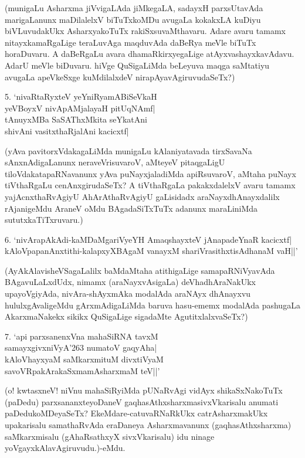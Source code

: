 \begin{itemize}
(munigaLu Asharxma jiVvigaLAda jiMkegaLA, sadayxH parxsUtavAda marigaLanunx maDilalelxV biTuTxkoMDu avugaLa kokakxLA kuDiyu biVLuvudakUkx AsharxyakoTuTx rakiSxsuvaMthavaru. Adare avaru tamamx nitayxkamaRgaLige teraLuvAga maqduvAda daBeRya meVle biTuTx horaDuvaru. A daBeRgaLu avara dhamaRkirxyegaLige atAyxvashayxkavAdavu. AdarU meVle biDuvaru. hiVge QuSigaLiMda beLeyuva maqga saMtatiyu avugaLa apeVkeSxge kuMdilalxdeV nirapAyavAgiruvudaSeTx?)

\begin{shloka}
\item[5.] `nivaRtaRyxteV yeYniRyamABiSeVkaH\\\label{56}
yeVBoyxV nivApAMjalayaH pitUqNAmf|\\
tAnuyxMBa SaSAThxMkita seYkatAni\\
shivAni vasitxthaRjalAni kacicxtf|
\end{shloka}

(yAva pavitorxVdakagaLiMda munigaLu kAlaniyatavada tirxSavaNa sAnxnAdigaLanunx neraveVrisuvaroV, aMteyeV pitaqgaLigU tiloVdakatapaRNavanunx yAva puNayxjaladiMda apiRsuvaroV, aMtaha puNayx tiVthaRgaLu cenAnxgirudaSeTx? A tiVthaRgaLa pakakxdalelxV avaru tamamx yajAcnxthaRvAgiyU AhArAthaRvAgiyU gaLisidadx araNayxdhAnayxdalilx rAjanigeMdu AraneV oMdu BAgadaSiTxTuTx adanunx maraLiniMda sututxkaTiTxruvaru.)

\begin{shloka}
\item[6.] `nivArapAkAdi-kaMDaMgariVyeYH AmaqshayxteV jAnapadeYnaR kacicxtf|\\\label{242}
kAloVpapanAnxtithi-kalapxyXBAgaM vanayxM shariVrasithxtisAdhanaM vaH||'
\end{shloka}

(AyAkAlavisheVSagaLalilx baMdaMtaha atithigaLige samapaRNiVyavAda BAgavuLaLxdUdx, nimamx (araNayxvAsigaLa) deVhadhAraNakUkx upayoVgiyAda, nivAra-shAyxmAka modalAda araNAyx dhAnayxvu hululxgAvaligeMdu gArxmAdigaLiMda baruva hasu-ememx modalAda pashugaLa AkarxmaNakekx sikikx QuSigaLige sigadaMte AgutitxlalxvaSeTx?)

\begin{shloka}
\item[7.] `api parxsanenxVna mahaSiRNA tavxM\\\label{57}
samayxgivxniVyA\char'263 numatoV gaqyAha|\\
kAloVhayxyaM saMkarxmituM divxtiVyaM\\
savoVRpakArakaSxmamAsharxmaM teV||' 
\end{shloka}

(o! kwtasxneV! niVnu mahaSiRyiMda pUNaRvAgi vidAyx shikaSxNakoTuTx (paDedu) parxsananxteyoDaneV gaqhasAthxsharxmasivxVkarisalu anumati paDedukoMDeyaSeTx? EkeMdare-catuvaRNaRkUkx catrAsharxmakUkx upakarisalu samathaRvAda eraDaneya Asharxmavanunx (gaqhasAthxsharxma) saMkarxmisalu (gAhaRsathxyX sivxVkarisalu) idu ninage yoVgayxkAlavAgiruvudu.)-eMdu.
\end{itemize}

